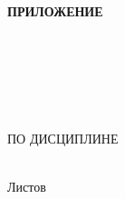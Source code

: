 \begin{ESKDtitlePage}
    \begin{flushright}
        \textbf{ПРИЛОЖЕНИЕ~\gpiPrilLetter} \enspace\enspace
    \end{flushright}
    \begin{center}
        \gpiEdu \\
        \gpiKaf \\
    \end{center}

    \vfill

    \begin{center}
        \gpiTopic \\
    \end{center}

    \vfill

    \begin{center}
        \textbf{\gpiDocTopic} \\
        ПО ДИСЦИПЛИНЕ \gpiDiscipline \\
    \end{center}

    \vfill

    \begin{center}
        \gpiCode \\
        Листов \pageref{LastPage} \\
    \end{center}

    \vfill

    

    \vfill

    \begin{center}
        \ESKDtheYear
    \end{center}
\end{ESKDtitlePage}
